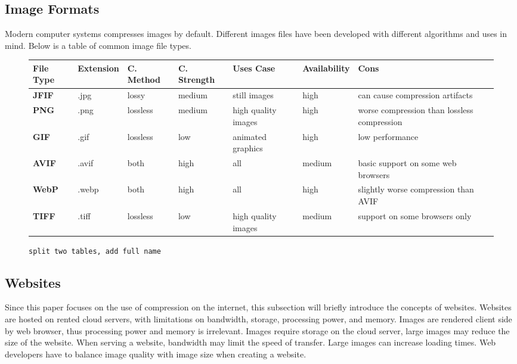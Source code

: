\documentclass{article}
\begin{document}
\subsection{Image Formats}
Modern computer systems compresses images by default.
Different images files have been developed with different algorithms and uses in mind.
Below is a table of common image file types.

\begin{figure}
\footnotesize
\begin{tabularx}{\textwidth}{X X X X X X X}
\toprule
File Type & Extension & C. Method & C. Strength & Uses Case           & Availability & Cons \\
\midrule
\bf JFIF  & .jpg      & lossy     & medium      & still images        & high         & can cause compression artifacts              \\
\bf PNG   & .png      & lossless  & medium      & high quality images & high         & worse compression than lossless compression \\
\bf GIF   & .gif      & lossless  & low         & animated graphics   & high         & low performance                              \\
\bf AVIF  & .avif     & both      & high        & all                 & medium       & basic support on some web browsers           \\
\bf WebP  & .webp     & both      & high        & all                 & high         & slightly worse compression than AVIF         \\
\bf TIFF  & .tiff     & lossless  & low         & high quality images & medium       & support on some browsers only                \\
\bottomrule
\end{tabularx}
\texttt{split two tables, add full name}
\end{figure}

\subsection{Websites}
Since this paper focuses on the use of compression on the internet, this subsection will briefly introduce the concepts of websites.
Websites are hosted on rented cloud servers, with limitations on bandwidth, storage, processing power, and memory.
Images are rendered client side by web browser, thus processing power and memory is irrelevant.
Images require storage on the cloud server, large images may reduce the size of the website.
When serving a website, bandwidth may limit the speed of transfer.
Large images can increase loading times.
Web developers have to balance image quality with image size when creating a website.
\end{document}
